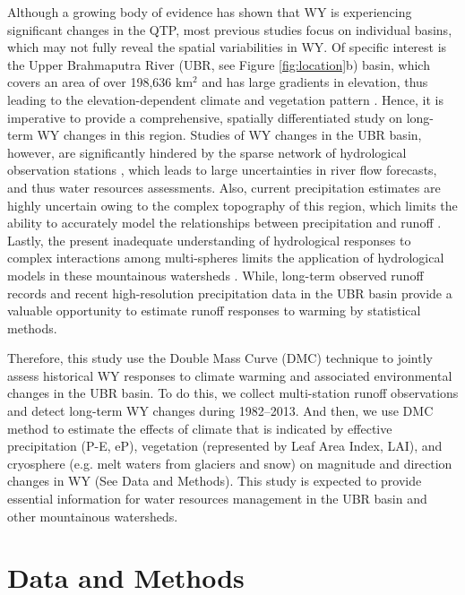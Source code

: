 \documentclass[hess, manuscript]{copernicus}
\begin{document}
Although a growing body of evidence has shown that WY is experiencing significant changes in the QTP, most previous studies focus on individual basins, which may not fully reveal the spatial variabilities in WY. Of specific interest is the Upper Brahmaputra River (UBR, see Figure \ref{fig:location}b) basin, which covers an area of over 198,636 km$^2$ and has large gradients in elevation, thus leading to the elevation-dependent climate and vegetation pattern \citep{li2019spatiotemporal,gao2018does}. Hence, it is imperative to provide a comprehensive, spatially differentiated study on long-term WY changes in this region. Studies of WY changes in the UBR basin, however, are significantly hindered by the sparse network of hydrological observation stations \citep{li2019spatiotemporal,wang2021tp,yao2019recent}, which leads to large uncertainties in river flow forecasts, and thus water resources assessments. Also, current precipitation estimates are highly uncertain owing to the complex topography of this region, which limits the ability to accurately model the relationships between precipitation and runoff \citep{sun2020precipitation}. Lastly, the present inadequate understanding of hydrological responses to complex interactions among multi-spheres limits the application of hydrological models in these mountainous watersheds \citep{pellicciotti2012challenges}. While, long-term observed runoff records and recent high-resolution precipitation data in the UBR basin provide a valuable opportunity to estimate runoff responses to warming by statistical methods. 

Therefore, this study use the Double Mass Curve (DMC) technique to jointly assess historical WY responses to climate warming and associated environmental changes in the UBR basin. To do this, we collect multi-station runoff observations and detect long-term WY changes during 1982--2013. And then, we use DMC method to estimate the effects of climate that is indicated by effective precipitation (P-E, eP), vegetation (represented by Leaf Area Index, LAI), and cryosphere (e.g. melt waters from glaciers and snow) on magnitude and direction changes in WY (See Data and Methods). This study is expected to provide essential information for water resources management in the UBR basin and other mountainous watersheds. 

\section{Data and Methods}
\end{document}
